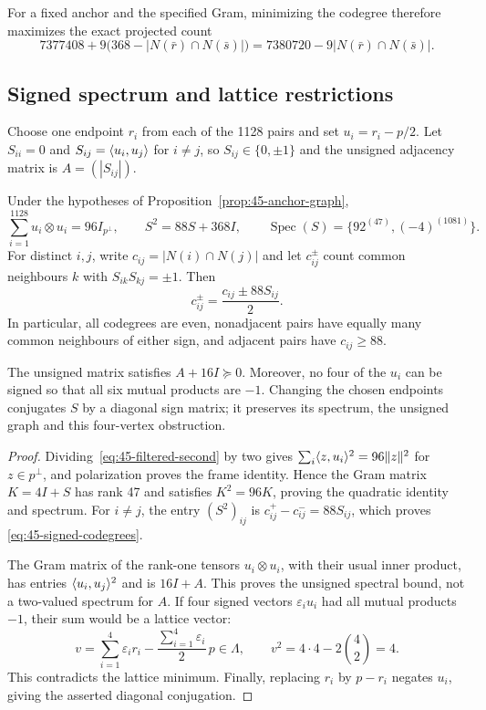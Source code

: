 For a fixed anchor and the specified Gram, minimizing the codegree
therefore maximizes the exact projected count
\[
7377408+9\bigl(368-|N(\bar r)\cap N(\bar s)|\bigr)
=7380720-9|N(\bar r)\cap N(\bar s)|.
\]

\subsection{Signed spectrum and lattice restrictions}
Choose one endpoint $r_i$ from each of the 1128 pairs and set
$u_i=r_i-p/2$. Let $S_{ii}=0$ and $S_{ij}=\langle u_i,u_j\rangle$ for
$i\ne j$, so $S_{ij}\in\{0,\pm1\}$ and the unsigned adjacency
matrix is $A=(|S_{ij}|)$.

\begin{proposition}\label{prop:45-signed-anchor}
Under the hypotheses of Proposition~\ref{prop:45-anchor-graph},
\begin{equation}\label{eq:45-signed-spectrum}
\sum_{i=1}^{1128}u_i\otimes u_i=96I_{p^\perp},\qquad
S^2=88S+368I,\qquad
\operatorname{Spec}(S)=\{92^{(47)},(-4)^{(1081)}\}.
\end{equation}
For distinct $i,j$, write $c_{ij}=|N(i)\cap N(j)|$ and let
$c_{ij}^{\pm}$ count common neighbours $k$ with
$S_{ik}S_{kj}=\pm1$. Then
\begin{equation}\label{eq:45-signed-codegrees}
c_{ij}^{\pm}=\frac{c_{ij}\pm88S_{ij}}2.
\end{equation}
In particular, all codegrees are even, nonadjacent pairs have equally
many common neighbours of either sign, and adjacent pairs have
$c_{ij}\ge88$.

The unsigned matrix satisfies $A+16I\succeq0$. Moreover, no four
of the $u_i$ can be signed so that all six mutual products are $-1$.
Changing the chosen endpoints conjugates $S$ by a diagonal sign
matrix; it preserves its spectrum, the unsigned graph and this
four-vertex obstruction.
\end{proposition}
\begin{proof}
Dividing~\eqref{eq:45-filtered-second} by two gives
$\sum_i\langle z,u_i\rangle^2=96\|z\|^2$ for $z\in p^\perp$,
and polarization proves the frame identity. Hence the Gram matrix
$K=4I+S$ has rank 47 and satisfies $K^2=96K$, proving the
quadratic identity and spectrum.
For $i\ne j$, the entry $(S^2)_{ij}$ is
$c_{ij}^+-c_{ij}^-=88S_{ij}$, which proves
\eqref{eq:45-signed-codegrees}.

The Gram matrix of the rank-one tensors $u_i\otimes u_i$, with
their usual inner product, has entries $\langle u_i,u_j\rangle^2$ and is
$16I+A$. This proves the unsigned spectral bound, not a two-valued
spectrum for $A$. If four signed vectors $\varepsilon_i u_i$ had
all mutual products $-1$, their sum would be a lattice vector:
\[
v=\sum_{i=1}^4\varepsilon_i r_i
  -\frac{\sum_{i=1}^4\varepsilon_i}{2}\,p\in\Lambda,
\qquad v^2=4\cdot4-2\binom42=4.
\]
This contradicts the lattice minimum. Finally, replacing $r_i$ by
$p-r_i$ negates $u_i$, giving the asserted diagonal conjugation.
\end{proof}

